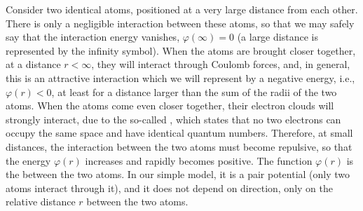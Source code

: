 Consider two identical atoms, positioned at a very large distance from each other.  There is only a negligible interaction between these atoms, so that we may safely say that the interaction energy vanishes, $\varphi(\infty)=0$ (a large distance is represented by the infinity symbol).  When the atoms are brought closer together, at a distance $r<\infty$, they will interact through Coulomb forces, and, in general, this is an attractive interaction which we will represent by a negative energy, i.e., $\varphi(r)<0$, at least for a distance larger than the sum of the radii of the two atoms.  When the atoms come even closer together, their electron clouds will strongly interact, due to the so-called , which states that no two electrons can occupy the same space and have identical quantum numbers. Therefore, at small distances, the interaction between the two atoms must become repulsive, so that the  energy $\varphi(r)$ increases and rapidly becomes positive.  The function $\varphi(r)$ is the  between the two atoms.  In our simple model, it is a pair potential  (only two atoms interact through it), and it does not depend on direction, only on the relative distance $r$ between the two atoms.

